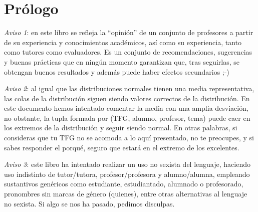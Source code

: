 \chapter{Prólogo}



\textit{Aviso 1}: en este libro se refleja la  “opinión” de un conjunto de profesores a partir de su experiencia y conocimientos académicos, así como su experiencia, tanto como tutores como evaluadores. Es un conjunto de recomendaciones, sugerencias y buenas prácticas que en ningún momento garantizan que, tras seguirlas, se obtengan buenos resultados y además puede haber efectos secundarios ;-) 

\textit{Aviso 2}: al igual que las distribuciones normales tienen una media representativa, las colas de la distribución siguen siendo valores correctos de la distribución. En este documento hemos intentado comentar la media con una amplia desviación, no obstante, la tupla formada por (TFG, alumno, profesor, tema) puede caer en los extremos de la distribución y seguir siendo normal. En otras palabras, si consideras que tu TFG no se acomoda a lo aquí presentado, no te preocupes, y si sabes responder el porqué, seguro que estará en el extremo de los excelentes. 

\textit{Aviso 3}: este libro ha intentado realizar un uso no sexista del lenguaje, haciendo uso indistinto de  tutor/tutora, profesor/profesora y alumno/alumna, empleando sustantivos genéricos como estudiante, estudiantado, alumnado o profesorado, pronombres sin marcas de género (quienes), entre otras alternativas al lenguaje no sexista. Si algo se nos ha pasado, pedimos disculpas.